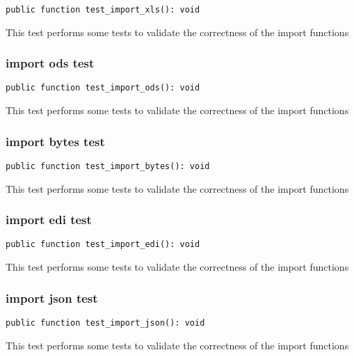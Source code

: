 \documentclass[a4paper]{article}
\begin{document}
\begin{lstlisting}
public function test_import_xls(): void
\end{lstlisting}

This test performs some tests to validate the correctness
of the import functions

\hypertarget{toc233}{}
\subsubsection{import ods test}

\begin{lstlisting}
public function test_import_ods(): void
\end{lstlisting}

This test performs some tests to validate the correctness
of the import functions

\hypertarget{toc234}{}
\subsubsection{import bytes test}

\begin{lstlisting}
public function test_import_bytes(): void
\end{lstlisting}

This test performs some tests to validate the correctness
of the import functions

\hypertarget{toc235}{}
\subsubsection{import edi test}

\begin{lstlisting}
public function test_import_edi(): void
\end{lstlisting}

This test performs some tests to validate the correctness
of the import functions

\hypertarget{toc236}{}
\subsubsection{import json test}

\begin{lstlisting}
public function test_import_json(): void
\end{lstlisting}

This test performs some tests to validate the correctness
of the import functions
\end{document}
